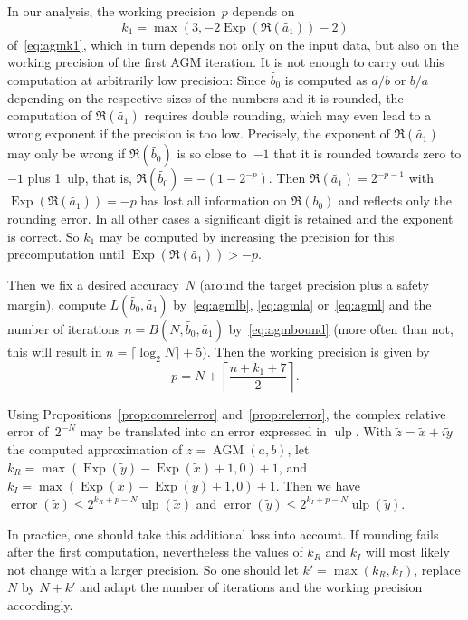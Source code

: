 \documentclass [11pt]{article}
\newcommand {\corr}[1]{{#1}}
\newcommand {\appro}[1]{\widetilde {#1}}
\newcommand {\ulp}[1]{#1~ulp}
\newcommand {\Ulp}{{\operatorname {ulp}}}
\DeclareMathOperator{\Exp}{\operatorname {Exp}}
\newcommand{\error}{\operatorname {error}}
\renewcommand {\leq}{\leqslant}
\newcommand {\AGM}{\operatorname{AGM}}
\begin{document}
In our analysis, the working precision~$p$ depends on
\[
k_1 = \max (3, - 2 \Exp (\Re (\appro {a_1})) - 2)
\]
of~\eqref {eq:agmk1}, which in turn depends not only on the input data,
but also on the working precision of the first AGM iteration. It is not
enough to carry out this computation at arbitrarily low precision:
Since $\appro {b_0}$ is computed as $a / b$ or $b / a$ depending on the
respective sizes of the numbers and it is rounded, the computation
of $\Re (\appro {a_1})$ requires double rounding, which may even lead to a
wrong exponent if the precision is too low. Precisely, the exponent of
$\Re (\appro {a_1})$ may only be wrong if $\Re (\appro {b_0})$ is so close
to~$-1$ that it is rounded towards zero to $-1$ plus \ulp {1}, that is,
$\Re (\appro {b_0}) = - (1 - 2^{-p})$. Then
$\Re (\appro {a_1}) = 2^{- p - 1}$ with $\Exp (\Re (\appro {a_1})) = -p$
has lost all information on $\Re (b_0)$ and reflects only the rounding
error. In all other cases a significant digit is retained and the exponent
is correct. So $k_1$ may be computed by increasing the precision for
this precomputation until $\Exp (\Re (\appro {a_1})) > -p$.

Then we fix a desired accuracy~$N$ (around the target precision plus a
safety margin), compute $L (\appro {b_0}, \appro {a_1})$
by~\eqref {eq:agmlb}, \eqref {eq:agmla} or~\eqref {eq:agml} and
the number of iterations
$n = B (N, \appro {b_0}, \appro {a_1})$ by~\eqref {eq:agmbound}
(more often than not, this will result in $n = \lceil \log_2 N \rceil + 5$).
Then the working precision is given by
\[
p = N + \left\lceil \frac {n + k_1 + 7}{2} \right\rceil.
\]

Using Propositions~\ref {prop:comrelerror} and~\ref {prop:relerror}, the
complex relative error of~$2^{-N}$ may be translated into an error
expressed in $\Ulp$.
With $\appro {z} = \appro x + i \appro y$
the computed approximation of $\corr {z} = \AGM (a, b)$, let
$k_R = \max (\Exp (\appro y) - \Exp (\appro x) + 1, 0) + 1$, and
$k_I = \max (\Exp (\appro x) - \Exp (\appro y) + 1, 0) + 1$.
Then we have
$\error (\appro x) \leq 2^{k_R + p - N} \Ulp (\appro x)$ and
$\error (\appro y) \leq 2^{k_I + p - N} \Ulp (\appro y)$.

In practice, one should take this additional loss into account.
If rounding fails after the first computation, nevertheless the values of
$k_R$ and $k_I$ will most likely not change with a larger precision.
So one should let $k' = \max (k_R, k_I)$, replace $N$ by $N + k'$
and adapt the number of iterations and the working precision accordingly.
\end{document}
